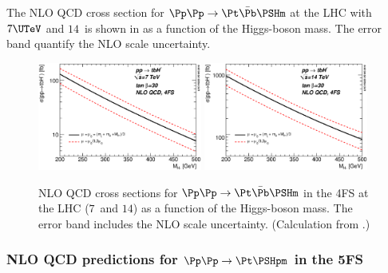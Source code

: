 The NLO QCD cross section for 
$\Pp\Pp \to {\Pt}\bar{\Pb}\PSHm$ at the LHC with $7\UTeV$ and $14$\UTeV\ is shown in
 as a function of the Higgs-boson mass. The
error band quantify the NLO scale uncertainty.


\begin{figure}
\begin{center}
\includegraphics[width=0.48\textwidth]{YRHXS_MSSM_charged/YRHXS_MSSM_charged_fig4a.eps}
\includegraphics[width=0.48\textwidth]{YRHXS_MSSM_charged/YRHXS_MSSM_charged_fig4b.eps}

 \caption{NLO QCD cross sections for 
     $\Pp\Pp \to {\Pt}\bar{\Pb}\PSHm$ in the 4FS at the LHC ($7$\UTeV\ and $14$\UTeV) as a function of
   the Higgs-boson mass. The error band includes the NLO scale
   uncertainty. 
   (Calculation from .)}
\label{fig:totalxs}
\end{center}
\end{figure}
        

\subsubsection{NLO QCD predictions for $\Pp\Pp \to \Pt \PSHpm$ in the 5FS}
\label{subsubsec:CH_5FS}

